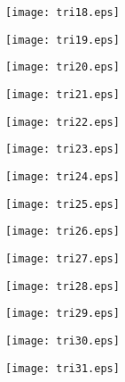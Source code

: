 \documentclass{beamer}
\theoremstyle{theorem}
\theoremstyle{definition}
\begin{document}
\begin{frame}
\texttt{[image: tri18.eps]}
\end{frame}

\begin{frame}
\texttt{[image: tri19.eps]}
\end{frame}

\begin{frame}
\texttt{[image: tri20.eps]}
\end{frame}

\begin{frame}
\texttt{[image: tri21.eps]}
\end{frame}

\begin{frame}
\texttt{[image: tri22.eps]}
\end{frame}

\begin{frame}
\texttt{[image: tri23.eps]}
\end{frame}

\begin{frame}
\texttt{[image: tri24.eps]}
\end{frame}

\begin{frame}
\texttt{[image: tri25.eps]}
\end{frame}
\begin{frame}
\texttt{[image: tri26.eps]}
\end{frame}

\begin{frame}
\texttt{[image: tri27.eps]}
\end{frame}

\begin{frame}
\texttt{[image: tri28.eps]}
\end{frame}

\begin{frame}
\texttt{[image: tri29.eps]}
\end{frame}

\begin{frame}
\texttt{[image: tri30.eps]}
\end{frame}

\begin{frame}
\texttt{[image: tri31.eps]}
\end{frame}

\iffalse
\end{document}
